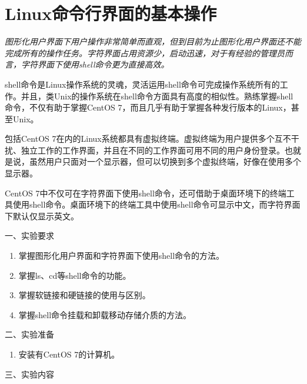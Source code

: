 \chapter{Linux命令行界面的基本操作}

{\itshape
图形化用户界面下用户操作非常简单而直观，但到目前为止图形化用户界面还不能完成所有的操作任务。字符界面占用资源少，启动迅速，对于有经验的管理员而言，字符界面下使用shell命令更为直接高效。

shell命令是Linux操作系统的灵魂，灵活运用shell命令可完成操作系统所有的工作。并且，类Unix的操作系统在shell命令方面具有高度的相似性。熟练掌握shell命令，不仅有助于掌握CentOS 7，而且几乎有助于掌握各种发行版本的Linux，甚至Unix。

包括CentOS 7在内的Linux系统都具有虚拟终端。虚拟终端为用户提供多个互不干扰、独立工作的工作界面，并且在不同的工作界面可用不同的用户身份登录。也就是说，虽然用户只面对一个显示器，但可以切换到多个虚拟终端，好像在使用多个显示器。

CentOS 7中不仅可在字符界面下使用shell命令，还可借助于桌面环境下的终端工具使用shell命令。桌面环境下的终端工具中使用shell命令可显示中文，而字符界面下默认仅显示英文。
}

\vspace{0.2in}
\noindent
一、实验要求
\begin{enumerate}
  \item 掌握图形化用户界面和字符界面下使用shell命令的方法。
  \item 掌握ls、cd等shell命令的功能。
  \item 掌握软链接和硬链接的使用与区别。
  \item 掌握shell命令挂载和卸载移动存储介质的方法。
\end{enumerate}

\vspace{0.2in}
\noindent
二、实验准备
\begin{enumerate}
  \item 安装有CentOS 7的计算机。
\end{enumerate}

\vspace{0.2in}
\noindent
三、实验内容

